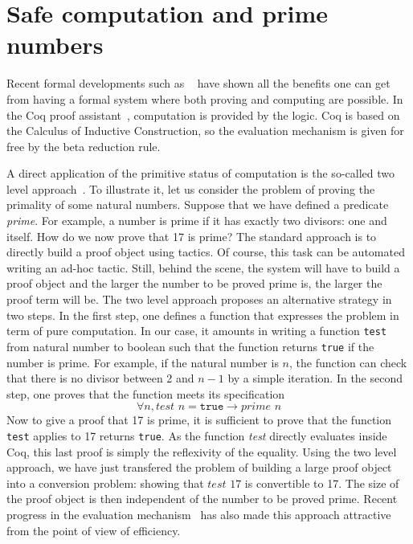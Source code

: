 

\section{Safe computation and prime numbers}

Recent formal developments such as ~\cite{4color,kepler} have shown all the benefits
one can get from having a formal system where both proving and computing are
possible. In the {\sc Coq} proof assistant~\cite{Coq}, computation is
provided by the logic. {\sc Coq} is based on the Calculus of 
Inductive Construction, so the evaluation mechanism is given for free
by the beta reduction rule. 

A direct application of the primitive status of computation is 
the so-called two level approach~\cite{boutin}. To illustrate it, 
let us consider the problem of proving the primality of some natural 
numbers.
Suppose that we have defined a predicate {\it prime}.
For example, a number is prime if it has exactly two divisors: one and
itself. How do we now prove that 17 is prime? The standard approach is to
directly build a proof object using tactics. Of course, this task can be 
automated writing an ad-hoc tactic. Still, behind the scene, the system 
will have to build a proof object and the larger the number to be proved
prime is, the larger the proof term will be.
The two level approach proposes an alternative
strategy in two steps. In the first step, one defines a function that expresses
the problem in term of pure computation. In our case, it amounts in writing a 
function {\tt test} from natural number to boolean such that the function
returns {\tt true} if the number is prime. For example, if the natural number
is $n$, the function can check that there is no divisor between 2 and $n-1$
by a simple iteration. In the second step, one proves that the function meets 
its specification
$$
\forall n, \textit{test}\,\, n = \texttt{true} \rightarrow \textit{prime}\,\, n
$$
Now to give a proof that 17 is prime, it is sufficient to prove that the function
{\tt test} applies to 17 returns {\tt true}. As the function {\it test} directly
evaluates inside {\sc Coq}, this last proof is simply the reflexivity of the equality.
Using the two level approach, we have just transfered the problem of building a 
large proof object into a conversion problem: showing that $test\,\, 17$ is convertible
to 17.  The size of the proof object is then independent of the number to be proved
prime. Recent progress in the evaluation mechanism~\cite{GreLer} has also made this
approach attractive from the point of view of efficiency.

